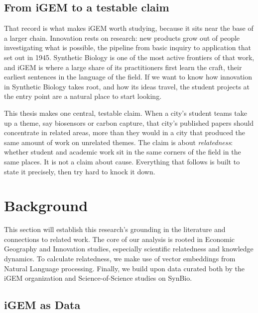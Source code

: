 \documentclass[12pt,a4paper]{article}
\begin{document}
	\subsection{From iGEM to a testable claim}
	
	That record is what makes iGEM worth studying, because it sits near the base of a
	larger chain. Innovation rests on research: new products grow out of people
	investigating what is possible, the pipeline from basic inquiry to application that
	\citet{bushScienceEndlessFrontier1945} set out in 1945. Synthetic Biology is one of the most active
	frontiers of that work, and iGEM is where a large share of its practitioners first
	learn the craft, their earliest sentences in the language of the field. If we want
	to know how innovation in Synthetic Biology takes root, and how its ideas travel,
	the student projects at the entry point are a natural place to start looking.
	
	This thesis makes one central, testable claim. When a city's student teams take up
	a theme, say biosensors or carbon capture, that city's published papers should
	concentrate in related areas, more than they would in a city that produced the
	same amount of work on unrelated themes. The claim is about \textit{relatedness}:
	whether student and academic work sit in the same corners of the field in the same
	places. It is not a claim about cause. Everything that follows is built to state
	it precisely, then try hard to knock it down.
	
	\section{Background}
	
	This section will establish this research's grounding in the literature and connections to related work. The core of our analysis is rooted in Economic Geography and Innovation studies, especially scientific relatedness and knowledge dynamics. To calculate relatedness, we make use of vector embeddings from Natural Language processing. Finally, we build upon data curated both by the iGEM organization and Science-of-Science studies on SynBio.
	
	\subsection{iGEM as Data}
	
\end{document}
